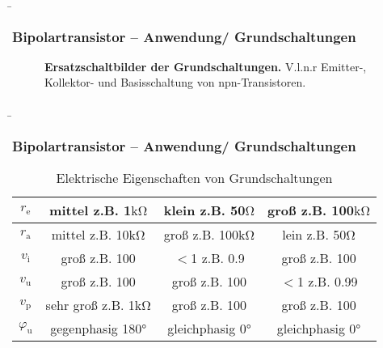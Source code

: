 \begin{frame}
    \b{ \frametitle{Bipolartransistor -- Anwendung/ Grundschaltungen}
        \begin{figure}[H]
            \label{fig:ErsatzschaltbilderEmitter-Kollektor-UndBasisschaltungFolien}
            \caption{\textbf{Ersatzschaltbilder der Grundschaltungen.} V.l.n.r Emitter-, Kollektor- und Basisschaltung von npn-Transistoren.} 
        \end{figure}}
\end{frame}

\begin{frame}
    \b{ \frametitle{Bipolartransistor -- Anwendung/ Grundschaltungen}
        \begin{table}[H]
            \centering
            \begin{tabular}{|c|c|c|c|}
                \hline
                $r_\mathrm{e}$ & mittel z.B. 1$\mathrm{k \Omega}$ & klein z.B. 50$\mathrm{\Omega}$ & groß z.B. 100$\mathrm{k \Omega}$ \\
                \hline
                $r_\mathrm{a}$ & mittel z.B. 10$\mathrm{k \Omega}$ & groß z.B. 100$\mathrm{k \Omega}$ & lein z.B. 50$\mathrm{\Omega}$ \\
                \hline
                $v_\mathrm{i}$ & groß z.B. 100 & $<$1 z.B. 0.9 &  groß z.B. 100 \\
                \hline
                $v_\mathrm{u}$ & groß z.B. 100 &  groß z.B. 100 & $<$1 z.B. 0.99 \\
                \hline
                $v_\mathrm{p}$ & sehr groß z.B. 1$\mathrm{k \Omega}$ &  groß z.B. 100 & groß z.B. 100 \\
                \hline
                $\varphi_\mathrm{u}$ & gegenphasig 180° & gleichphasig 0° & gleichphasig 0° \\
                \hline
            \end{tabular}
            \caption{Elektrische Eigenschaften von Grundschaltungen}
        \end{table}
    }
\end{frame}


